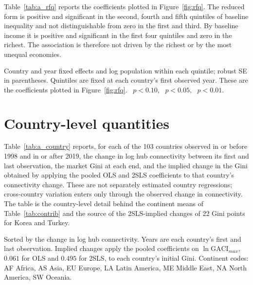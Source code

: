 Table~\ref{tab:a_rfq} reports the coefficients plotted in Figure~\ref{fig:rfq}. The reduced form is positive and significant in the second, fourth and fifth quintiles of baseline inequality and not distinguishable from zero in the first and third. By baseline income it is positive and significant in the first four quintiles and zero in the richest. The association is therefore not driven by the richest or by the most unequal economies.

\begin{table}[H]\centering\caption{Reduced form of the Feyrer instrument on the market Gini, by baseline quintile.}\label{tab:a_rfq}
\begin{threeparttable}\small
\begin{tablenotes}\footnotesize\item Country and year fixed effects and log population within each quintile; robust SE in parentheses. Quintiles are fixed at each country's first observed year. These are the coefficients plotted in Figure~\ref{fig:rfq}. \sym{*}~$p<0.10$, \sym{**}~$p<0.05$, \sym{***}~$p<0.01$.\end{tablenotes}\end{threeparttable}\end{table}

\section{Country-level quantities}
\label{app:country}
Table~\ref{tab:a_country} reports, for each of the 103 countries observed in or before 1998 and in or after 2019, the change in log hub connectivity between its first and last observation, the market Gini at each end, and the implied change in the Gini obtained by applying the pooled OLS and 2SLS coefficients to that country's connectivity change. These are not separately estimated country regressions; cross-country variation enters only through the observed change in connectivity. The table is the country-level detail behind the continent means of Table~\ref{tab:contrib} and the source of the 2SLS-implied changes of 22 Gini points for Korea and Turkey.

\begin{table}[H]\centering\caption{Implied contribution of hub-connectivity growth to the market Gini, by country.}\label{tab:a_country}
\begin{threeparttable}\scriptsize
\begin{tablenotes}\scriptsize\item Sorted by the change in log hub connectivity. Years are each country's first and last observation. Implied changes apply the pooled coefficients on $\ln\mathrm{GACI}_{max}$, $0.061$ for OLS and $0.495$ for 2SLS, to each country's initial Gini. Continent codes: AF Africa, AS Asia, EU Europe, LA Latin America, ME Middle East, NA North America, SW Oceania.\end{tablenotes}\end{threeparttable}\end{table}

